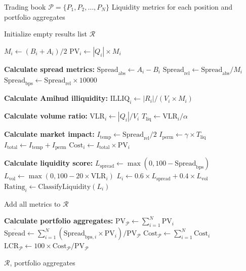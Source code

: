 \documentclass[11pt,a4paper]{article}
\begin{document}
\begin{algorithm}
\caption{Trading Book Liquidity Analysis}
\begin{algorithmic}[1]
\Require Trading book $\mathcal{P} = \{P_1, P_2, \ldots, P_N\}$
\Ensure Liquidity metrics for each position and portfolio aggregates

\State Initialize empty results list $\mathcal{R}$

    \State $M_i \gets (B_i + A_i) / 2$ 
    \State $\text{PV}_i \gets |Q_i| \times M_i$ 

    \State \textbf{Calculate spread metrics:}
    \State $\text{Spread}_{\text{abs}} \gets A_i - B_i$
    \State $\text{Spread}_{\text{rel}} \gets \text{Spread}_{\text{abs}} / M_i$
    \State $\text{Spread}_{\text{bps}} \gets \text{Spread}_{\text{rel}} \times 10000$

    \State \textbf{Calculate Amihud illiquidity:}
    \State $\text{ILLIQ}_i \gets |R_i| / (V_i \times M_i)$

    \State \textbf{Calculate volume ratio:}
    \State $\text{VLR}_i \gets |Q_i| / V_i$
    \State $T_{\text{liq}} \gets \text{VLR}_i / \alpha$ 

    \State \textbf{Calculate market impact:}
    \State $I_{\text{temp}} \gets \text{Spread}_{\text{rel}} / 2$
    \State $I_{\text{perm}} \gets \gamma \times T_{\text{liq}}$
    \State $I_{\text{total}} \gets I_{\text{temp}} + I_{\text{perm}}$
    \State $\text{Cost}_i \gets I_{\text{total}} \times \text{PV}_i$

    \State \textbf{Calculate liquidity score:}
    \State $L_{\text{spread}} \gets \max(0, 100 - \text{Spread}_{\text{bps}})$
    \State $L_{\text{vol}} \gets \max(0, 100 - 20 \times \text{VLR}_i)$
    \State $L_i \gets 0.6 \times L_{\text{spread}} + 0.4 \times L_{\text{vol}}$
    \State $\text{Rating}_i \gets \text{ClassifyLiquidity}(L_i)$

    \State Add all metrics to $\mathcal{R}$
\EndFor

\State \textbf{Calculate portfolio aggregates:}
\State $\text{PV}_{\mathcal{P}} \gets \sum_{i=1}^{N} \text{PV}_i$
\State $\overline{\text{Spread}} \gets \sum_{i=1}^{N} (\text{Spread}_{\text{bps},i} \times \text{PV}_i) / \text{PV}_{\mathcal{P}}$
\State $\text{Cost}_{\mathcal{P}} \gets \sum_{i=1}^{N} \text{Cost}_i$
\State $\text{LCR}_{\mathcal{P}} \gets 100 \times \text{Cost}_{\mathcal{P}} / \text{PV}_{\mathcal{P}}$

\Return $\mathcal{R}$, portfolio aggregates
\end{algorithmic}
\end{algorithm}
\end{document}
